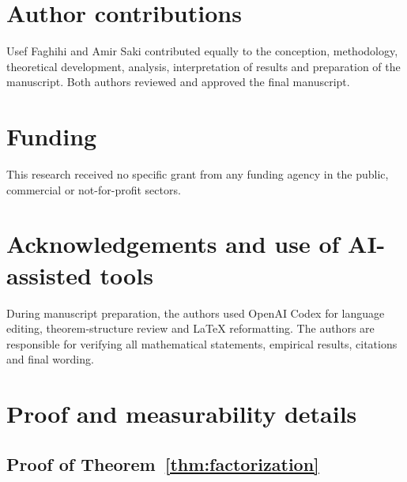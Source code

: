 \documentclass[11pt]{article}
\theoremstyle{plain}
\theoremstyle{definition}
\numberwithin{equation}{section}
\newcommand{\1}{\mathbf 1}
\begin{document}
\section*{Author contributions}
Usef Faghihi and Amir Saki contributed equally to the conception,
methodology, theoretical development, analysis, interpretation of
results and preparation of the manuscript. Both authors reviewed and
approved the final manuscript.


\section*{Funding}
This research received no specific grant from any funding agency in
the public, commercial or not-for-profit sectors.
\section*{Acknowledgements and use of AI-assisted tools}
During manuscript preparation, the authors used OpenAI Codex for language editing, theorem-structure review and LaTeX reformatting. The authors are responsible for verifying all mathematical statements, empirical results, citations and final wording.

\appendix
\renewcommand{\thesection}{\Alph{section}}
\renewcommand{\theHsection}{appendix.\Alph{section}}
\section{Proof and measurability details}\label{sec:appendix}

\subsection{Proof of Theorem~\ref{thm:factorization}}
\end{document}
